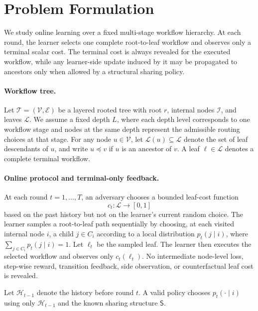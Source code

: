 \documentclass{article}
\begin{document}
\section{Problem Formulation}
\label{sec:problem}

We study online learning over a fixed multi-stage workflow hierarchy. At each round, the learner selects one complete root-to-leaf workflow and observes only a terminal scalar cost. The terminal cost is always revealed for the executed workflow, while any learner-side update induced by it may be propagated to ancestors only when allowed by a structural sharing policy.

\paragraph{Workflow tree.}
Let \(\mathcal{T}=(\mathcal{V},\mathcal{E})\) be a layered rooted tree with root \(r\), internal nodes \(\mathcal{I}\), and leaves \(\mathcal{L}\). We assume a fixed depth \(L\), where each depth level corresponds to one workflow stage and nodes at the same depth represent the admissible routing choices at that stage. For any node \(u\in\mathcal{V}\), let \(\mathcal{L}(u)\subseteq\mathcal{L}\) denote the set of leaf descendants of \(u\), and write \(u\preceq v\) if \(u\) is an ancestor of \(v\). A leaf \(\ell\in\mathcal{L}\) denotes a complete terminal workflow.

\paragraph{Online protocol and terminal-only feedback.}
At each round \(t=1,\dots,T\), an adversary chooses a bounded leaf-cost function
\[
c_t:\mathcal{L}\rightarrow[0,1]
\]
based on the past history but not on the learner's current random choice. The learner samples a root-to-leaf path sequentially by choosing, at each visited internal node \(i\), a child \(j\in C_i\) according to a local distribution \(p_t(j\mid i)\), where \(\sum_{j\in C_i}p_t(j\mid i)=1\). Let \(\ell_t\) be the sampled leaf. The learner then executes the selected workflow and observes only \(c_t(\ell_t)\). No intermediate node-level loss, step-wise reward, transition feedback, side observation, or counterfactual leaf cost is revealed.

Let \(\mathcal{H}_{t-1}\) denote the history before round \(t\). A valid policy chooses \(p_t(\cdot\mid i)\) using only \(\mathcal{H}_{t-1}\) and the known sharing structure \(\mathsf{S}\).
\end{document}
